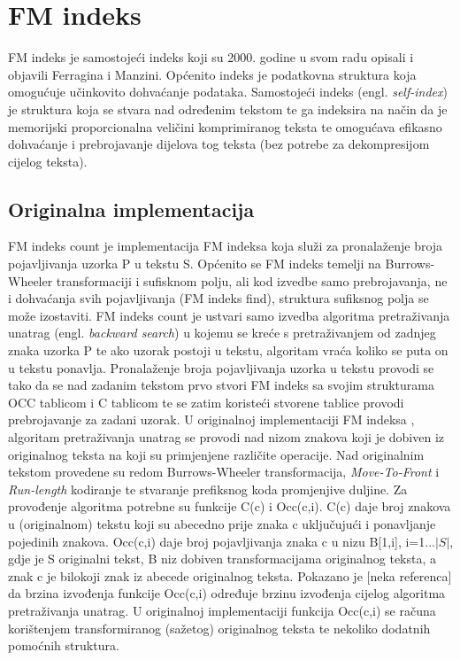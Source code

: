 \section{FM indeks}
FM indeks je samostojeći indeks koji su 2000. godine u svom radu opisali i objavili Ferragina i Manzini. Općenito indeks je podatkovna struktura koja omogućuje učinkovito dohvaćanje podataka. Samostojeći indeks (engl. \emph{self-index}) je struktura koja se stvara nad određenim tekstom te ga indeksira na način da je memorijski proporcionalna veličini komprimiranog teksta te omogućava efikasno dohvaćanje i prebrojavanje dijelova tog teksta (bez potrebe za dekompresijom cijelog teksta).


\subsection{Originalna implementacija}
FM indeks count je implementacija FM indeksa koja služi za pronalaženje broja pojavljivanja uzorka P u tekstu S. Općenito se FM indeks temelji na Burrows-Wheeler transformaciji i sufisknom polju, ali kod izvedbe samo prebrojavanja, ne i dohvaćanja svih pojavljivanja (FM indeks find), struktura sufiksnog polja se može izostaviti.
FM indeks count je ustvari samo izvedba algoritma pretraživanja unatrag  (engl. \emph{backward search}) u kojemu se kreće s pretraživanjem od zadnjeg znaka uzorka P te ako uzorak postoji u tekstu, algoritam vraća koliko se puta on u tekstu ponavlja.
Pronalaženje broja pojavljivanja uzorka u tekstu provodi se tako da se nad zadanim tekstom prvo stvori FM indeks sa svojim strukturama OCC tablicom i C tablicom te se zatim koristeći stvorene tablice provodi prebrojavanje za zadani uzorak.
U originalnoj implementaciji FM indeksa  \cite{fm1}, algoritam pretraživanja unatrag se provodi nad nizom znakova koji je dobiven iz originalnog teksta na koji su primjenjene različite operacije. Nad originalnim tekstom provedene su redom Burrows-Wheeler transformacija, \emph{Move-To-Front} i \emph{Run-length} kodiranje te stvaranje prefiksnog koda promjenjive duljine.  Za provođenje algoritma potrebne su funkcije C(c) i Occ(c,i). C(c) daje broj znakova u (originalnom) tekstu koji su abecedno prije znaka c uključujući i ponavljanje pojedinih znakova. Occ(c,i) daje broj pojavljivanja znaka c u nizu B[1,i], i=1...$|S|$, gdje je S originalni tekst, B niz dobiven transformacijama originalnog teksta, a znak c je bilokoji znak iz abecede originalnog teksta. Pokazano je [neka referenca] da brzina izvođenja funkcije Occ(c,i) određuje brzinu izvođenja cijelog algoritma pretraživanja unatrag. U originalnoj implementaciji funkcija Occ(c,i) se računa korištenjem transformiranog (sažetog) originalnog teksta te nekoliko dodatnih pomoćnih struktura. 

